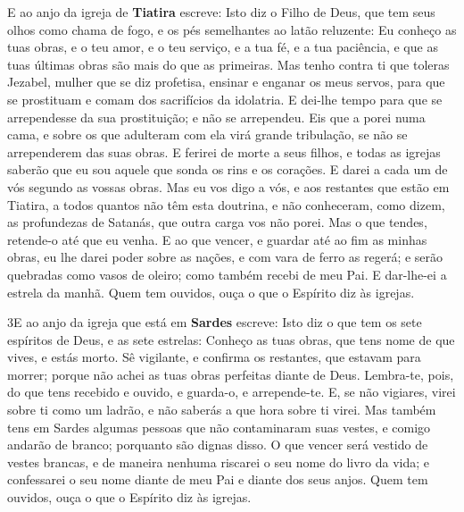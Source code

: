 E ao anjo da igreja de \textbf{Tiatira} escreve: Isto diz o Filho
de Deus, que tem seus olhos como chama de fogo, e os pés semelhantes
ao latão reluzente: Eu conheço as tuas obras, e o teu amor, e
o teu serviço, e a tua fé, e a tua paciência, e que as tuas últimas
obras são mais do que as primeiras. Mas tenho contra ti que
toleras Jezabel, mulher que se diz profetisa, ensinar e enganar os
meus servos, para que se prostituam e comam dos sacrifícios da
idolatria. E dei-lhe tempo para que se  arrependesse da sua
prostituição; e não se arrependeu. Eis que a porei numa cama,
e sobre os que adulteram com ela virá grande tribulação, se não se
arrependerem das suas obras. E ferirei de morte a seus
filhos, e todas as igrejas saberão que eu sou aquele que sonda os
rins e os corações. E darei a cada um de vós segundo as vossas
obras. Mas eu vos digo a vós, e aos restantes que estão em
Tiatira, a todos quantos não têm esta doutrina, e não conheceram,
como dizem, as profundezas de Satanás, que outra carga vos não
porei. Mas o que tendes, retende-o até que eu venha. E
ao que vencer, e guardar até ao fim  as minhas obras, eu lhe darei
poder sobre as nações, e com vara de ferro as regerá; e serão
quebradas como vasos de oleiro; como também recebi de meu Pai.
E dar-lhe-ei a estrela da manhã. Quem tem ouvidos,
ouça o que o Espírito diz às igrejas.

\medskip

\lettrine{3} E ao anjo da igreja que está em \textbf{Sardes}
escreve: Isto diz o que tem os sete espíritos de Deus, e as sete
estrelas: Conheço as tuas obras, que tens nome de que vives, e estás
morto. Sê vigilante, e confirma os restantes, que estavam para
morrer; porque não achei as tuas obras perfeitas diante de Deus.
Lembra-te, pois, do que tens recebido e ouvido, e guarda-o, e
arrepende-te. E, se não vigiares, virei sobre ti como um ladrão, e
não saberás a que hora sobre ti virei. Mas também tens em Sardes
algumas pessoas que não contaminaram suas vestes, e comigo andarão
de branco; porquanto são dignas disso. O que vencer será vestido
de vestes brancas, e de maneira nenhuma riscarei o seu nome do livro
da vida; e confessarei o seu nome diante de meu Pai e diante dos
seus anjos. Quem tem ouvidos, ouça o que o Espírito diz às
igrejas.

